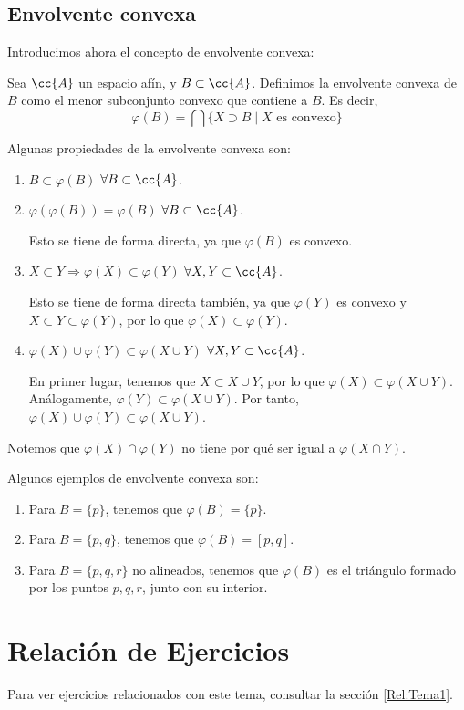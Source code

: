 \subsection{Envolvente convexa}
Introducimos ahora el concepto de envolvente convexa:
\begin{definicion}
    Sea $\cc{A}$ un espacio afín, y $B\subset \cc{A}$. Definimos la envolvente convexa de $B$ como el menor subconjunto convexo que contiene a $B$. Es decir,
    \begin{equation*}
        \varphi(B)=\bigcap \{X\supset B\mid X\text{ es convexo}\}
    \end{equation*}
\end{definicion}

Algunas propiedades de la envolvente convexa son:
\begin{enumerate}

    \item $B\subset \varphi(B)$ \qquad $\forall B\subset \cc{A}$.
    \item $\varphi(\varphi(B))=\varphi (B)$ \qquad $\forall B\subset \cc{A}$.
    
    Esto se tiene de forma directa, ya que $\varphi(B)$ es convexo.

    \item $X\subset Y \Longrightarrow \varphi(X)\subset \varphi(Y)$ \qquad $\forall X,Y\subset \cc{A}$.
    
    Esto se tiene de forma directa también, ya que $\varphi(Y)$ es convexo y $X\subset Y\subset \varphi(Y)$, por lo que $\varphi(X)\subset \varphi(Y)$.

    \item $\varphi (X)\cup \varphi (Y)\subset \varphi (X\cup Y)$ \qquad $\forall X,Y\subset \cc{A}$.
    
    En primer lugar, tenemos que $X \subset X\cup Y$, por lo que $\varphi(X)\subset \varphi(X\cup Y)$. Análogamente, $\varphi(Y)\subset \varphi(X\cup Y)$. Por tanto, $\varphi(X)\cup \varphi(Y)\subset \varphi(X\cup Y)$.
\end{enumerate}

Notemos que $\varphi(X)\cap \varphi(Y)$ no tiene por qué ser igual a $\varphi(X\cap Y)$.
\begin{ejemplo}
    Algunos ejemplos de envolvente convexa son:
    \begin{enumerate}
        \item Para $B=\{p\}$, tenemos que $\varphi(B)=\{p\}$.
        \item Para $B=\{p,q\}$, tenemos que $\varphi(B)=[p,q]$.
        \item Para $B=\{p,q,r\}$ no alineados, tenemos que $\varphi(B)$ es el triángulo formado por los puntos $p,q,r$, junto con su interior.
    \end{enumerate}
\end{ejemplo}

\section{Relación de Ejercicios}

Para ver ejercicios relacionados con este tema, consultar la sección \ref{Rel:Tema1}.